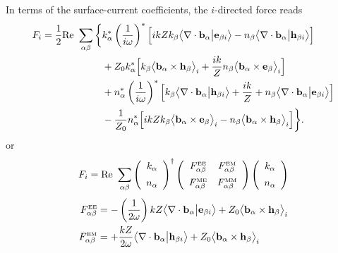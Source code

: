 In terms of the surface-current coefficients, the $i$-directed force reads 
\begin{align*}
 F_i
= \frac{1}{2}\text{Re }\sum_{\alpha\beta}
 \bigg\{&
   k^*_\alpha\left(\frac{1}{i\omega}\right)^*
    \Big[ ikZ k_\beta \big\langle \nabla \cdot \mathbf{b}_\alpha \big| \mathbf{e}_{\beta i} \big\rangle
             -n_\beta  \big\langle \nabla \cdot \mathbf{b}_\alpha \big| \mathbf{h}_{\beta i} \big\rangle
    \Big]
\\
&+ Z_0 k^*_\alpha
    \Big[ k_\beta \big\langle \mathbf{b}_\alpha \times \mathbf{h}_\beta\big\rangle_i
         +\frac{ik}{Z} n_\beta \big\langle \mathbf{b}_\alpha \times \mathbf{e}_\beta\big\rangle_i
    \Big]
\\
&+
   n^*_\alpha\left(\frac{1}{i\omega}\right)^*
    \Big[ k_\beta \big\langle \nabla \cdot \mathbf{b}_\alpha \big| \mathbf{h}_{\beta i} \big\rangle
         +\frac{ik}{Z} +n_\beta \big\langle \nabla \cdot \mathbf{b}_\alpha \big| \mathbf{e}_{\beta i} \big\rangle
    \Big]
\\
&- \frac{1}{Z_0} n^*_\alpha
    \Big[ ikZ k_\beta \big\langle \mathbf{b}_\alpha \times \mathbf{e}_\beta\big\rangle_i
          -n_\beta \big\langle \mathbf{b}_\alpha \times \mathbf{h}_\beta\big\rangle_i
    \Big] \bigg\}.
\end{align*}
or 
$$
 F_i
  = \text{Re }\sum_{\alpha\beta}
    \left(
     \begin{array}{c}
      k_\alpha \\[5pt]
      n_\alpha
     \end{array}
    \right) ^\dagger
    \left(\begin{array}{cc}
     F^{\hbox{\tiny{EE}}}_{\alpha\beta} & 
     F^{\hbox{\tiny{EM}}}_{\alpha\beta} \\[5pt]
     F^{\hbox{\tiny{ME}}}_{\alpha\beta} &
     F^{\hbox{\tiny{MM}}}_{\alpha\beta}
     \end{array}
    \right)
    \left(
     \begin{array}{c}
      k_\alpha \\[5pt]
      n_\alpha
     \end{array}
    \right)
$$
\begin{align*}
 F^{\hbox{\tiny{EE}}}_{\alpha\beta}
 &=
 -\left(\frac{1}{2\omega}\right)
  kZ \big\langle \nabla \cdot \mathbf{b}_\alpha \big| \mathbf{e}_{\beta i} \big\rangle
               +Z_0  \big\langle \mathbf{b}_\alpha \times \mathbf{h}_\beta\big\rangle_i 
\\
 F^{\hbox{\tiny{EM}}}_{\alpha\beta}
 &=
 +\frac{kZ}{2\omega} \big\langle \nabla \cdot \mathbf{b}_\alpha \big| \mathbf{h}_{\beta i} \big\rangle
               +Z_0  \big\langle \mathbf{b}_\alpha \times \mathbf{h}_\beta\big\rangle_i 
\\
\end{align*}
